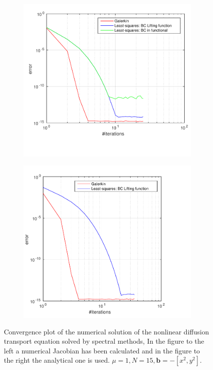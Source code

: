 \begin{figure}[h]
  \centering
  \begin{subfigure}[b]{0.48\textwidth}
	\includegraphics[width=\textwidth]{Figures/Spec_Nonlin_Convergence_Jnum.pdf}
  \end{subfigure}%
  \quad
  \begin{subfigure}[b]{0.48\textwidth}
	\includegraphics[width=\textwidth]{Figures/Spec_Nonlin_Convergence.pdf}
  \end{subfigure}%
  \vspace{-0.1\baselineskip}
	\caption{Convergence plot of the numerical solution of the nonlinear diffusion transport equation solved by spectral methods, In the figure to the left a numerical Jacobian has been calculated and in the figure to the right the analytical one is used. $\mu = 1,N=15,\mathbf{b} = -[x^2,y^2]$.}
  \label{fig:convergenceNonlinear}
\end{figure}
%


